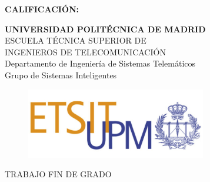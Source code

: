 {\large{\bf CALIFICACIÓN:}}
\pagestyle{empty}
\cleardoublepage
\vspace*{\baselineskip}
\begin{center}
	
	{\LARGE\rm\textbf{UNIVERSIDAD POLITÉCNICA DE MADRID}\\
	    \vspace{1.0cm}
	    ESCUELA TÉCNICA SUPERIOR DE\\ INGENIEROS DE TELECOMUNICACIÓN
	}   \\

	{\Large\rm Departamento de Ingeniería de Sistemas Telemáticos\\
	    Grupo de Sistemas Inteligentes  
	}   \\

    \begin{figure}[!htbp]
	    \centering
        \includegraphics[width=0.7\textwidth]{img/logo_etsit.jpg}
    \end{figure}
    
	\vspace{1.0cm}
	{\LARGE\rm TRABAJO FIN DE GRADO\\
	    \vspace{2.0cm}
        \MakeUppercase{ \textbf{\tfgtitle} } \\ 
	}
	\vspace{1.0cm}
    \Large\rm\textbf{\authorname}\\ 
    \vspace{1.0cm}
    \fecha
\end{center}  

\cleardoublepage
